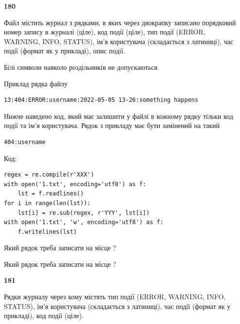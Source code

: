 \newpage

{\begin {center}\textbf{ 180}\end {center}}\par
Файл  містить журнал з рядками, в яких через двокрапку записано поряд\-ко\-вий номер запису в журналі (ціле), код події (ціле), тип події (ERROR, \\WARNING, INFO, STATUS), ім'я користувача (складається з латиниці), час події (фор\-мат як у прикладі), опис події.

Білі символи навколо роздільників не допускаються.

Приклад рядка файлу



\begin{verbatim}
13:404:ERROR:username:2022-05-05 13-26:something happens
\end{verbatim}


Нижче наведено код, який має залишити у файлі в кожному рядку тільки код події та ім'я користувача. Рядок з прикладу має бути замінений на такий



\begin{verbatim}
404:username
\end{verbatim}




Код:



\begin{verbatim}
regex = re.compile(r'XXX')
with open('1.txt', encoding='utf8') as f:
    lst = f.readlines()
for i in range(len(lst)):
    lst[i] = re.sub(regex, r'YYY', lst[i])
with open('1.txt', 'w', encoding='utf8') as f:
    f.writelines(lst)
\end{verbatim}







Який рядок треба записати на місце  ?\par
\vspace{5mm}


Який рядок треба записати на місце  ?\par


\newpage

{\begin {center}\textbf{ 181}\end {center}}\par
Рядки журналу через кому містять тип події (ERROR, WARNING, INFO, STATUS), ім'я користувача (складається з латиниці), час події (фор\-мат як у прикладі), код події (ціле).

